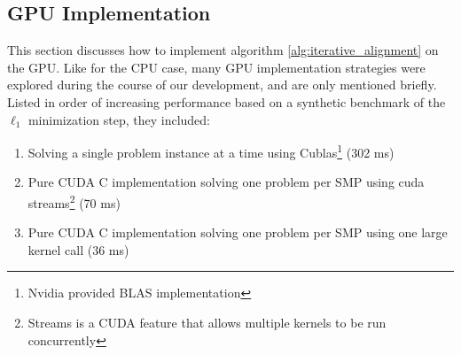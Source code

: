 \documentclass[10pt,twocolumn,letterpaper]{article}
\begin{document}



\subsection{GPU Implementation}
\label{sec:alignment_implementation_gpu}

This section discusses how to implement algorithm
\eqref{alg:iterative_alignment} on the GPU.  Like for the CPU case, many GPU
implementation strategies were explored during the course of our development,
and are only mentioned briefly.  Listed in order of increasing performance
based on a synthetic benchmark of the $\ell_1$ minimization step, they
included:
\begin{enumerate}
\item Solving a single problem instance at a time using Cublas\footnote{Nvidia provided BLAS implementation} (302 ms)
\item Pure CUDA C implementation solving one problem per SMP using cuda streams\footnote{Streams is a CUDA feature that allows multiple
kernels to be run concurrently} (70 ms)
\item Pure CUDA C implementation solving one problem per SMP using one large kernel call (36 ms)
\end{enumerate}
\end{document}
